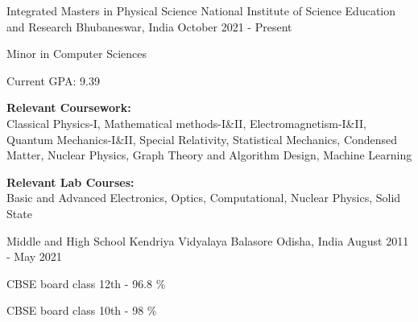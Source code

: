 

\begin{cventries}

  \cventry
    {Integrated Masters in Physical Science} %
    {National Institute of Science Education and Research} %
    {Bhubaneswar, India} %
    {October 2021 - Present} %
    {
      \begin{cvitems} %
        \item {Minor in Computer Sciences}
        \item {Current GPA: 9.39}
        \item{\textbf{Relevant Coursework:} \\Classical Physics-I, Mathematical methods-I\&II, Electromagnetism-I\&II, Quantum Mechanics-I\&II, Special Relativity, Statistical Mechanics, Condensed Matter, Nuclear Physics, Graph Theory and Algorithm Design, Machine Learning} 
        \item{\textbf{Relevant Lab Courses:} \\Basic and Advanced Electronics, Optics, Computational, Nuclear Physics, Solid State}
      \end{cvitems}
    }
    
  \cventry
    {Middle and High School} %
    {Kendriya Vidyalaya Balasore} %
    {Odisha, India} %
    {August 2011 - May 2021} %
    {
      \begin{cvitems} %
        \item CBSE board class 12th - 96.8 \%
        \item CBSE board class 10th - 98 \%
      \end{cvitems}
    }
\end{cventries}
